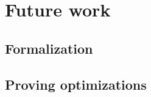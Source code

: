 \documentclass[a4paper,11pt]{article}
\theoremstyle{plain}
\theoremstyle{definition}
\theoremstyle{remark}
\begin{document}
\begin{itemize}
\end{itemize}

\section{Future work}

\subsection{Formalization}

\subsection{Proving optimizations}






\newpage
\appendix
\end{document}
